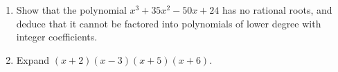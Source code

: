 \begin{enumerate}
\item[(a)] Show that the polynomial $x^3+35x^2-50x+24$ has no rational roots, and deduce that it cannot be factored into polynomials of lower degree with integer coefficients.
\item[(b)] Expand $(x+2)(x-3)(x+5)(x+6)$.
\end{enumerate}
